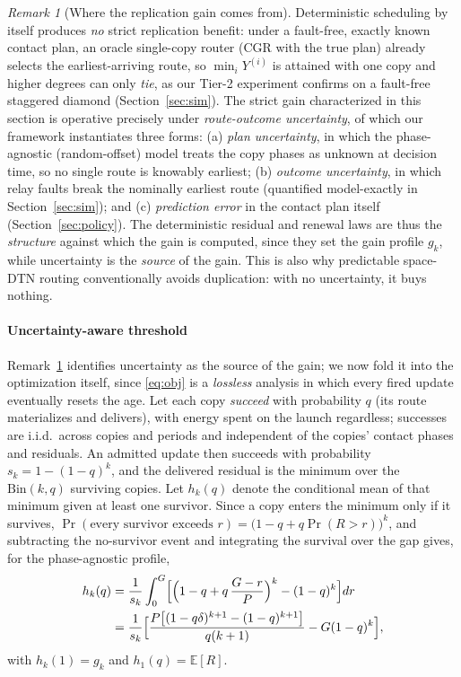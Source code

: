 \documentclass[twocolumn,3p,times,procedia]{elsarticle}
\theoremstyle{plain}
\theoremstyle{remark}
\newtheorem{remark}{Remark}
\newcommand{\E}{\mathbb{E}}
\begin{document}
\begin{remark}[Where the replication gain comes from]
\label{rem:uncertainty}
Deterministic scheduling by itself produces \emph{no} strict replication
benefit: under a fault-free, exactly known contact plan, an oracle
single-copy router (CGR with the true plan) already selects the
earliest-arriving route, so $\min_i Y^{(i)}$ is attained with one copy
and higher degrees can only \emph{tie}, as our Tier-2 experiment
confirms on a fault-free staggered diamond (Section~\ref{sec:sim}). The
strict gain characterized in this section is operative precisely under
\emph{route-outcome uncertainty}, of which our framework instantiates
three forms: (a) \emph{plan uncertainty}, in which the phase-agnostic
(random-offset) model treats the copy phases as unknown at decision
time, so no single route is knowably earliest; (b) \emph{outcome
uncertainty}, in which relay faults break the nominally earliest
route (quantified model-exactly in Section~\ref{sec:sim}); and (c)
\emph{prediction error} in the contact plan itself
(Section~\ref{sec:policy}). The deterministic residual and renewal laws
are thus the \emph{structure} against which the gain is computed, since
they set the gain profile $g_k$, while uncertainty is the \emph{source}
of the gain. This is
also why predictable space-DTN routing conventionally avoids
duplication: with no uncertainty, it buys nothing.
\end{remark}

\paragraph*{Uncertainty-aware threshold}
Remark~\ref{rem:uncertainty} identifies uncertainty as the source of the
gain; we now fold it into the optimization itself, since \eqref{eq:obj}
is a \emph{lossless} analysis in which every fired update eventually
resets the age. Let each
copy \emph{succeed} with probability $q$ (its route materializes and
delivers), with energy spent on the launch regardless; successes are
i.i.d.\ across copies and periods and independent of the copies'
contact phases and residuals.
An admitted update then succeeds with probability
$s_k=1-(1-q)^k$, and the delivered residual is the minimum over the
$\mathrm{Bin}(k,q)$ surviving copies. Let $h_k(q)$ denote the
conditional mean of that minimum given at least one survivor. Since a
copy enters the minimum only if it survives,
$\Pr(\text{every survivor exceeds }r)=\bigl(1-q+q\Pr(R>r)\bigr)^k$, and
subtracting the no-survivor event and integrating the survival over
the gap gives, for the phase-agnostic profile,
\begin{equation}\label{eq:hq}
\begin{aligned}
h_k(q)&=\frac{1}{s_k}\int_0^{G}\Bigl[\Bigl(1-q+q\,\frac{G-r}{P}\Bigr)^{k}
-(1-q)^{k}\Bigr]dr\\
&=\frac{1}{s_k}\Bigl[\frac{P\bigl[(1-q\delta)^{k+1}-(1-q)^{k+1}\bigr]}{q(k+1)}
-G(1-q)^{k}\Bigr],
\end{aligned}
\end{equation}
with $h_k(1)=g_k$ and $h_1(q)=\E[R]$.
\end{document}
